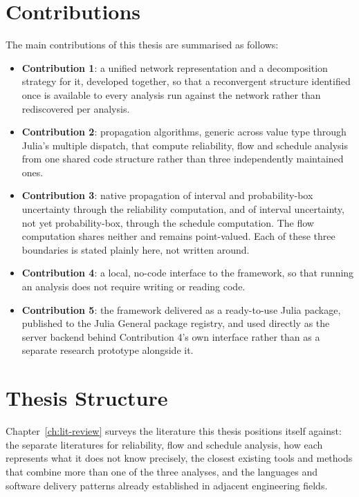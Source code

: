 \documentclass[12pt]{report}
\begin{document}
\section{Contributions}
\label{sec:intro-contributions}

The main contributions of this thesis are summarised as follows:

\begin{itemize}
  \item \textbf{Contribution 1}: a unified network representation and a decomposition strategy for
    it, developed together, so that a reconvergent structure identified once is available to
    every analysis run against the network rather than rediscovered per analysis.
  \item \textbf{Contribution 2}: propagation algorithms, generic across value type through Julia's
    multiple dispatch, that compute reliability, flow and schedule analysis from one shared code
    structure rather than three independently maintained ones.
  \item \textbf{Contribution 3}: native propagation of interval and probability-box uncertainty
    through the reliability computation, and of interval uncertainty, not yet probability-box,
    through the schedule computation. The flow computation shares neither and remains point-valued.
    Each of these three boundaries is stated plainly here, not written around.
  \item \textbf{Contribution 4}: a local, no-code interface to the framework, so that running an
    analysis does not require writing or reading code.
  \item \textbf{Contribution 5}: the framework delivered as a ready-to-use Julia package, published
    to the Julia General package registry, and used directly as the server backend behind
    Contribution 4's own interface rather than as a separate research prototype alongside it.
\end{itemize}

\section{Thesis Structure}
\label{sec:intro-structure}

Chapter~\ref{ch:lit-review} surveys the literature this thesis positions itself against: the
separate literatures for reliability, flow and schedule analysis, how each represents what it does
not know precisely, the closest existing tools and methods that combine more than one of the three
analyses, and the languages and software delivery patterns already established in adjacent
engineering fields.
\end{document}
